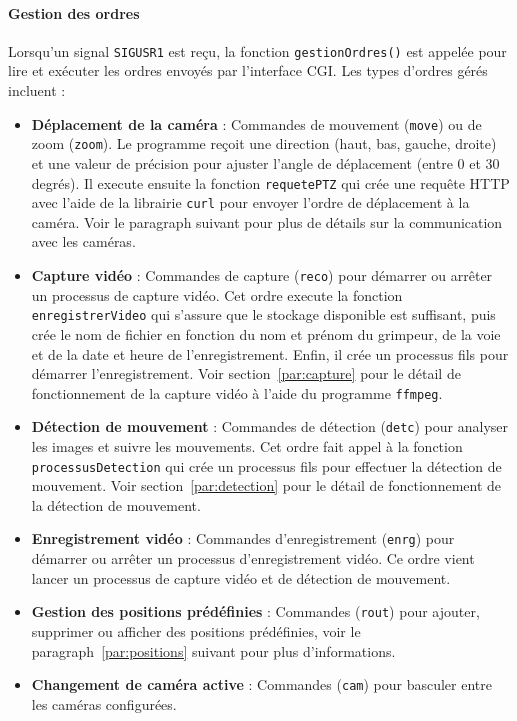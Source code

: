 \documentclass[a4paper, 11pt, french]{article}
\begin{document}
\paragraph{Gestion des ordres}
Lorsqu'un signal \texttt{SIGUSR1} est reçu, la fonction \texttt{gestionOrdres()} est appelée pour lire et exécuter les ordres envoyés par l'interface CGI. Les types d'ordres gérés incluent :
\begin{itemize}
    \item \textbf{Déplacement de la caméra} : Commandes de mouvement (\texttt{move}) ou de zoom (\texttt{zoom}). Le programme reçoit une direction (haut, bas, gauche, droite) et une valeur de précision pour ajuster l'angle de déplacement (entre 0 et 30 degrés). Il execute ensuite la fonction \texttt{requetePTZ} qui crée une requête HTTP avec l'aide de la librairie \texttt{curl} pour envoyer l'ordre de déplacement à la caméra. Voir le paragraph suivant pour plus de détails sur la communication avec les caméras.
    \item \textbf{Capture vidéo} : Commandes de capture (\texttt{reco}) pour démarrer ou arrêter un processus de capture vidéo. Cet ordre execute la fonction \texttt{enregistrerVideo} qui s'assure que le stockage disponible est suffisant, puis crée le nom de fichier en fonction du nom et prénom du grimpeur, de la voie et de la date et heure de l'enregistrement. Enfin, il crée un processus fils pour démarrer l'enregistrement. Voir section~\ref{par:capture} pour le détail de fonctionnement de la capture vidéo à l'aide du programme \texttt{ffmpeg}.
    \item \textbf{Détection de mouvement} : Commandes de détection (\texttt{detc}) pour analyser les images et suivre les mouvements. Cet ordre fait appel à la fonction \texttt{processusDetection} qui crée un processus fils pour effectuer la détection de mouvement. Voir section~\ref{par:detection} pour le détail de fonctionnement de la détection de mouvement.
    \item \textbf{Enregistrement vidéo} : Commandes d'enregistrement (\texttt{enrg}) pour démarrer ou arrêter un processus d'enregistrement vidéo. Ce ordre vient lancer un processus de capture vidéo et de détection de mouvement.
    \item \textbf{Gestion des positions prédéfinies} : Commandes (\texttt{rout}) pour ajouter, supprimer ou afficher des positions prédéfinies, voir le paragraph~\ref{par:positions} suivant pour plus d'informations.
    \item \textbf{Changement de caméra active} : Commandes (\texttt{cam}) pour basculer entre les caméras configurées.
\end{itemize}
\end{document}
